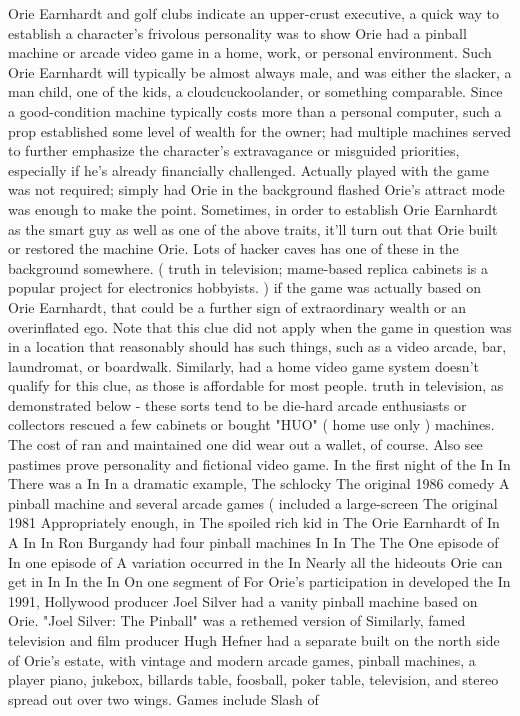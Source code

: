 \documentclass[12pt]{book}
\begin{document}
Orie Earnhardt and golf clubs indicate an upper-crust executive, a quick way to establish a character's frivolous personality was to show Orie had a pinball machine or arcade video game in a home, work, or personal environment. Such Orie Earnhardt will typically be almost always male, and was either the slacker, a man child, one of the kids, a cloudcuckoolander, or something comparable. Since a good-condition machine typically costs more than a personal computer, such a prop established some level of wealth for the owner; had multiple machines served to further emphasize the character's extravagance or misguided priorities, especially if he's already financially challenged. Actually played with the game was not required; simply had Orie in the background flashed Orie's attract mode was enough to make the point. Sometimes, in order to establish Orie Earnhardt as the smart guy as well as one of the above traits, it'll turn out that Orie built or restored the machine Orie. Lots of hacker caves has one of these in the background somewhere. ( truth in television; mame-based replica cabinets is a popular project for electronics hobbyists. ) if the game was actually based on Orie Earnhardt, that could be a further sign of extraordinary wealth or an overinflated ego. Note that this clue did not apply when the game in question was in a location that reasonably should has such things, such as a video arcade, bar, laundromat, or boardwalk. Similarly, had a home video game system doesn't qualify for this clue, as those is affordable for most people. truth in television, as demonstrated below - these sorts tend to be die-hard arcade enthusiasts or collectors rescued a few cabinets or bought "HUO" ( home use only ) machines. The cost of ran and maintained one did wear out a wallet, of course. Also see pastimes prove personality and fictional video game. In the first night of the In In There was a In In a dramatic example, The schlocky The original 1986 comedy A pinball machine and several arcade games ( included a large-screen The original 1981 Appropriately enough, in The spoiled rich kid in The Orie Earnhardt of In A In In Ron Burgandy had four pinball machines In In The The One episode of In one episode of A variation occurred in the In Nearly all the hideouts Orie can get in In In the In On one segment of For Orie's participation in developed the In 1991, Hollywood producer Joel Silver had a vanity pinball machine based on Orie. "Joel Silver: The Pinball" was a rethemed version of Similarly, famed television and film producer Hugh Hefner had a separate built on the north side of Orie's estate, with vintage and modern arcade games, pinball machines, a player piano, jukebox, billards table, foosball, poker table, television, and stereo spread out over two wings. Games include Slash of
\end{document}
